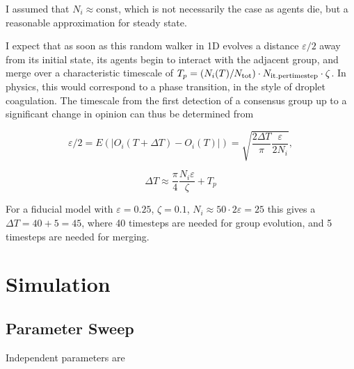 \documentclass[useAMS,usenatbib]{mn2e}
\begin{document}
I assumed that $N_i\approx \text{const}$, which is not necessarily the
case as agents die, but a reasonable approximation for steady state.

I expect that as soon as this random walker in 1D evolves a distance
$\varepsilon/2$ away from its initial state, its agents begin to
interact with the adjacent group, and merge over a characteristic timescale of
$T_p = (N_i(T)/N_{\rm tot})\cdot N_{\rm it. per timestep}\cdot \zeta$. In physics, this would correspond to
a phase transition, in the style of droplet coagulation. The timescale from the first detection of a
consensus group up to a significant change in opinion can thus be
determined from

\begin{equation}
    \varepsilon/2 = E(|O_i(T+\Delta T)-O_i(T)|) =  \sqrt{\frac{2\Delta T}{\pi}\frac{\varepsilon}{2 N_i}},
\end{equation}

\begin{equation}
    \Delta T \approx \frac{\pi}{4}\frac{N_i\varepsilon}{\zeta} + T_p
\end{equation}

For a fiducial model with $\varepsilon=0.25$, $\zeta=0.1$, $N_i\approx 50\cdot
2\varepsilon = 25$ this gives a $\Delta T=40+5=45$, where 40 timesteps
are needed for group evolution, and 5 timesteps are
needed for merging.

\section{Simulation}
\label{sec:sim}

\subsection{Parameter Sweep}
\label{sec:parameter_sweep}

Independent parameters are
\end{document}
